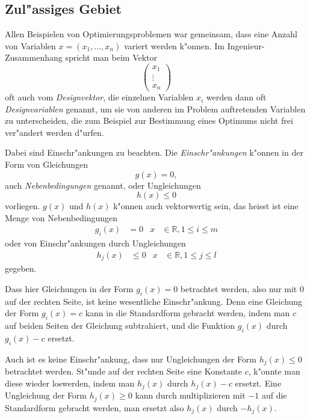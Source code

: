 \subsection{Zul"assiges Gebiet}
Allen Beispielen von Optimierungsproblemen war gemeinsam, dass eine
Anzahl von Variablen $x=(x_1,\dots,x_n)$ variert werden k"onnen.
Im Ingenieur-Zusammenhang spricht man beim Vektor 
\[
\begin{pmatrix}
x_1\\\vdots\\x_n
\end{pmatrix}
\]
oft auch vom {\em Designvektor}, die einzelnen Variablen $x_i$ werden
dann oft {\em Designvariablen} genannt, um sie von anderen im Problem
auftretenden Variablen zu unterscheiden, die zum Beispiel zur Bestimmung
eines Optimums nicht frei ver"andert werden d"urfen.

Dabei sind Einschr"ankungen zu beachten.
Die {\em Einschr"ankungen} k"onnen in der Form von Gleichungen
\begin{equation}
g(x)=0,
\label{begriff-nebenbedingungen}
\end{equation}
auch {\em Nebenbedingungen} genannt, oder Ungleichungen
\begin{equation}
h(x)\le 0
\label{begriff-einschraenkungen}
\end{equation}
vorliegen.
$g(x)$ und $h(x)$ k"onnen auch vektorwertig sein,
das heisst ist eine Menge von Nebenbedingungen
\begin{align*}
g_i(x)&=0&x&\in\mathbb R, 1\le i\le m
\end{align*}
oder von Einschr"ankungen durch Ungleichungen
\begin{align*}
h_j(x)&\le 0&x&\in\mathbb R, 1\le j\le l
\end{align*}
gegeben.

Dass hier Gleichungen in der Form $g_i(x)=0$ betrachtet werden, also
nur mit $0$ auf der rechten Seite, ist keine wesentliche Einschr"ankung.
Denn eine Gleichung der Form $g_i(x)=c$ kann in die Standardform gebracht
werden, indem man $c$ auf beiden Seiten der Gleichung subtrahiert,
und die Funktion $g_i(x)$ durch $g_i(x)-c$ ersetzt.

Auch ist es keine Einschr"ankung, dass nur Ungleichungen der Form 
$h_j(x)\le 0$ betrachtet werden. St"unde auf der rechten Seite eine
Konstante $c$, k"onnte man diese wieder loswerden, indem man $h_j(x)$
durch $h_j(x)-c$ ersetzt. Eine Ungleichung der Form $h_j(x)\ge 0$
kann durch multiplizieren mit $-1$ auf die Standardform gebracht werden,
man ersetzt also $h_j(x)$ durch $-h_j(x)$.

